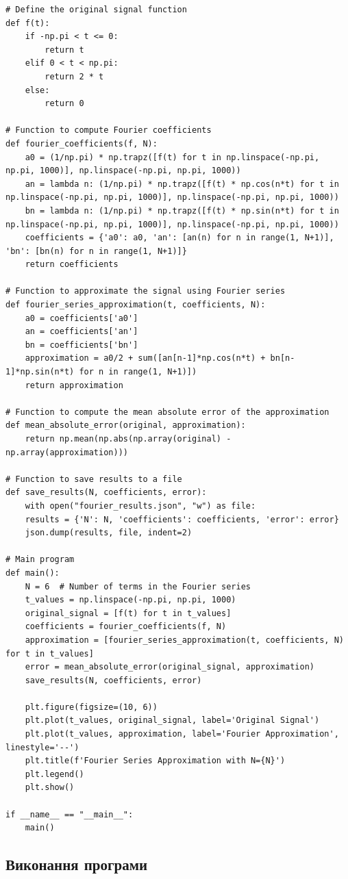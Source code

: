 \documentclass[oneside,14pt]{extarticle}
\begin{document}
\begin{normalsize}
{\begin{lstlisting}
# Define the original signal function
def f(t):
	if -np.pi < t <= 0:
		return t
	elif 0 < t < np.pi:
		return 2 * t
	else:
		return 0

# Function to compute Fourier coefficients
def fourier_coefficients(f, N):
	a0 = (1/np.pi) * np.trapz([f(t) for t in np.linspace(-np.pi, np.pi, 1000)], np.linspace(-np.pi, np.pi, 1000))
	an = lambda n: (1/np.pi) * np.trapz([f(t) * np.cos(n*t) for t in np.linspace(-np.pi, np.pi, 1000)], np.linspace(-np.pi, np.pi, 1000))
	bn = lambda n: (1/np.pi) * np.trapz([f(t) * np.sin(n*t) for t in np.linspace(-np.pi, np.pi, 1000)], np.linspace(-np.pi, np.pi, 1000))
	coefficients = {'a0': a0, 'an': [an(n) for n in range(1, N+1)], 'bn': [bn(n) for n in range(1, N+1)]}
	return coefficients

# Function to approximate the signal using Fourier series
def fourier_series_approximation(t, coefficients, N):
	a0 = coefficients['a0']
	an = coefficients['an']
	bn = coefficients['bn']
	approximation = a0/2 + sum([an[n-1]*np.cos(n*t) + bn[n-1]*np.sin(n*t) for n in range(1, N+1)])
	return approximation

# Function to compute the mean absolute error of the approximation
def mean_absolute_error(original, approximation):
	return np.mean(np.abs(np.array(original) - np.array(approximation)))

# Function to save results to a file
def save_results(N, coefficients, error):
	with open("fourier_results.json", "w") as file:
	results = {'N': N, 'coefficients': coefficients, 'error': error}
	json.dump(results, file, indent=2)

# Main program
def main():
	N = 6  # Number of terms in the Fourier series
	t_values = np.linspace(-np.pi, np.pi, 1000)
	original_signal = [f(t) for t in t_values]
	coefficients = fourier_coefficients(f, N)
	approximation = [fourier_series_approximation(t, coefficients, N) for t in t_values]
	error = mean_absolute_error(original_signal, approximation)
	save_results(N, coefficients, error)

	plt.figure(figsize=(10, 6))
	plt.plot(t_values, original_signal, label='Original Signal')
	plt.plot(t_values, approximation, label='Fourier Approximation', linestyle='--')
	plt.title(f'Fourier Series Approximation with N={N}')
	plt.legend()
	plt.show()

if __name__ == "__main__":
	main()\end{lstlisting}
	}
	
	\subsection*{Виконання програми}
	

\end{normalsize}
\end{document}
